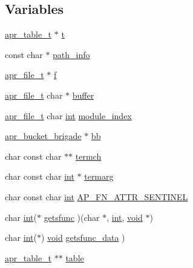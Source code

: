 \subsection*{Variables}
\begin{DoxyCompactItemize}
\item 
\hyperlink{structapr__table__t}{apr\+\_\+table\+\_\+t} $\ast$ \hyperlink{group__APACHE__CORE__SCRIPT_gad350742715474fb8bcf9a1e2917498b1}{t}
\item 
const char $\ast$ \hyperlink{group__APACHE__CORE__SCRIPT_ga8fe018b9749972d64c22742029459c5b}{path\+\_\+info}
\item 
\hyperlink{structapr__file__t}{apr\+\_\+file\+\_\+t} $\ast$ \hyperlink{group__APACHE__CORE__SCRIPT_ga08c56f8ee324f070de0f31b0bf87de72}{f}
\item 
\hyperlink{structapr__file__t}{apr\+\_\+file\+\_\+t} char $\ast$ \hyperlink{group__APACHE__CORE__SCRIPT_gaff2566f4c366b48d73479bef43ee4d2e}{buffer}
\item 
\hyperlink{structapr__file__t}{apr\+\_\+file\+\_\+t} char \hyperlink{pcre_8txt_a42dfa4ff673c82d8efe7144098fbc198}{int} \hyperlink{group__APACHE__CORE__SCRIPT_gafe3efe4874f4178a9d30f4a0889957c3}{module\+\_\+index}
\item 
\hyperlink{structapr__bucket__brigade}{apr\+\_\+bucket\+\_\+brigade} $\ast$ \hyperlink{group__APACHE__CORE__SCRIPT_ga0b0eadb381dbe958da483f3d9fc9521a}{bb}
\item 
char const char $\ast$$\ast$ \hyperlink{group__APACHE__CORE__SCRIPT_gab78ba2f7bb789ce3a183fa707b2c6dfc}{termch}
\item 
char const char \hyperlink{pcre_8txt_a42dfa4ff673c82d8efe7144098fbc198}{int} $\ast$ \hyperlink{group__APACHE__CORE__SCRIPT_ga6d870b9625a7bf32270fbaf02d2badf1}{termarg}
\item 
char const char \hyperlink{pcre_8txt_a42dfa4ff673c82d8efe7144098fbc198}{int} \hyperlink{group__APACHE__CORE__SCRIPT_ga2862bb7a008daea7f74384d50f69ef68}{A\+P\+\_\+\+F\+N\+\_\+\+A\+T\+T\+R\+\_\+\+S\+E\+N\+T\+I\+N\+EL}
\item 
char \hyperlink{pcre_8txt_a42dfa4ff673c82d8efe7144098fbc198}{int}($\ast$ \hyperlink{group__APACHE__CORE__SCRIPT_gaec1898c3826a871b62aa827595dce20a}{getsfunc} )(char $\ast$, \hyperlink{pcre_8txt_a42dfa4ff673c82d8efe7144098fbc198}{int}, \hyperlink{group__MOD__ISAPI_gacd6cdbf73df3d9eed42fa493d9b621a6}{void} $\ast$)
\item 
char \hyperlink{pcre_8txt_a42dfa4ff673c82d8efe7144098fbc198}{int}($\ast$) \hyperlink{group__MOD__ISAPI_gacd6cdbf73df3d9eed42fa493d9b621a6}{void} \hyperlink{group__APACHE__CORE__SCRIPT_gac02d658f319b3d5b305d32c19f20bf4b}{getsfunc\+\_\+data} )
\item 
\hyperlink{structapr__table__t}{apr\+\_\+table\+\_\+t} $\ast$$\ast$ \hyperlink{group__APACHE__CORE__SCRIPT_ga354a8f67383593e40ef4d649a6b47773}{table}
\end{DoxyCompactItemize}


